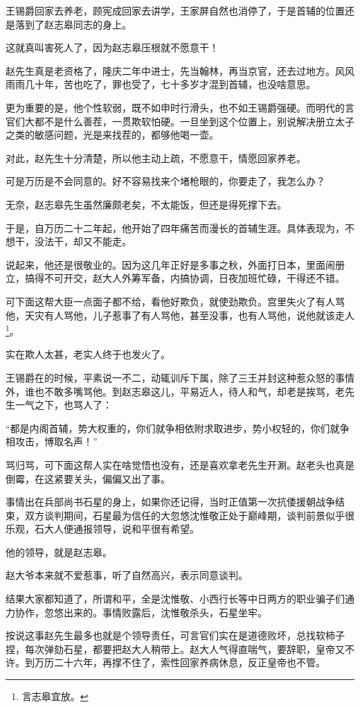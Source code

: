 \begin{multicols}{\theparacolNo}
王锡爵回家去养老，顾宪成回家去讲学，王家屏自然也消停了，于是首辅的位置还是落到了赵志皋同志的身上。

这就真叫害死人了，因为赵志皋压根就不愿意干！

赵先生真是老资格了，隆庆二年中进士，先当翰林，再当京官，还去过地方。风风雨雨几十年，苦也吃了，罪也受了，七十多岁才混到首辅，也没啥意思。

更为重要的是，他个性软弱，既不如申时行滑头，也不如王锡爵强硬。而明代的言官们大都不是什么善茬，一贯欺软怕硬。一旦坐到这个位置上，别说解决册立太子之类的敏感问题，光是来找茬的，都够他喝一壶。

对此，赵先生十分清楚，所以他主动上疏，不愿意干，情愿回家养老。

可是万历是不会同意的。好不容易找来个堵枪眼的，你要走了，我怎么办？

无奈，赵志皋先生虽然廉颇老矣，不太能饭，但还是得死撑下去。

于是，自万历二十二年起，他开始了四年痛苦而漫长的首辅生涯。具体表现为，不想干，没法干，却又不能走。

说起来，他还是很敬业的。因为这几年正好是多事之秋，外面打日本，里面闹册立，搞得不可开交，赵大人外筹军备，内搞协调，日夜加班忙碌，干得还不错。

可下面这帮大臣一点面子都不给，看他好欺负，就使劲欺负。宫里失火了有人骂他，天灾有人骂他，儿子惹事了有人骂他，甚至没事，也有人骂他，说他就该走人\footnote{言志皋宜放。}。

实在欺人太甚，老实人终于也发火了。

王锡爵在的时候，平素说一不二，动辄训斥下属，除了三王并封这种惹众怒的事情外，谁也不敢多嘴骂他。到赵志皋这儿，平易近人，待人和气，却老是挨骂，老先生一气之下，也骂人了：

“都是内阁首辅，势大权重的，你们就争相依附求取进步，势小权轻的，你们就争相攻击，博取名声！”

骂归骂，可下面这帮人实在啥觉悟也没有，还是喜欢拿老先生开涮。赵老头也真是倒霉，在这紧要关头，偏偏又出了事。

事情出在兵部尚书石星的身上，如果你还记得，当时正值第一次抗倭援朝战争结束，双方谈判期间，石星最为信任的大忽悠沈惟敬正处于巅峰期，谈判前景似乎很乐观，石大人便通报领导，说和平很有希望。

他的领导，就是赵志皋。

赵大爷本来就不爱惹事，听了自然高兴，表示同意谈判。

结果大家都知道了，所谓和平，全是沈惟敬、小西行长等中日两方的职业骗子们通力协作，忽悠出来的。事情败露后，沈惟敬杀头，石星坐牢。

按说这事赵先生最多也就是个领导责任，可言官们实在是道德败坏，总找软柿子捏，每次弹劾石星，都要把赵大人稍带上。赵大人气得直喘气，要辞职，皇帝又不许。到万历二十六年，再撑不住了，索性回家养病休息，反正皇帝也不管。


\end{multicols}
